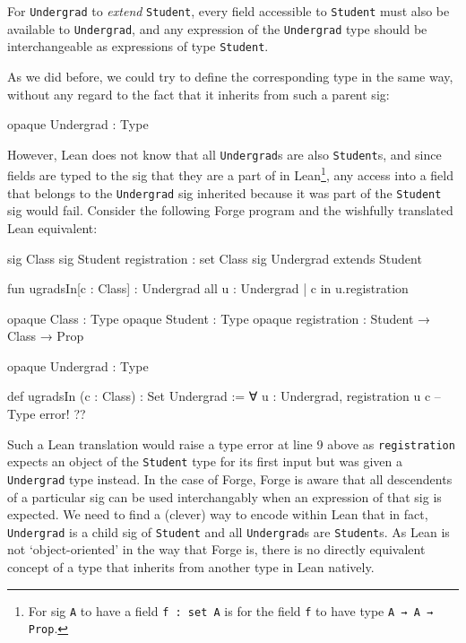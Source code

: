 For \texttt{Undergrad} to \emph{extend} \texttt{Student}, every field accessible to \texttt{Student} must also be available to \texttt{Undergrad}, and any expression of the \texttt{Undergrad} type should be interchangeable as expressions of type \texttt{Student}. 

As we did before, we could try to define the corresponding type in the same way, without any regard to the fact that it inherits from such a parent sig: 
\begin{lean*}
opaque Undergrad : Type
\end{lean*}
However, Lean does not know that all \texttt{Undergrad}s are also \texttt{Student}s, and since fields are typed to the sig that they are a part of in Lean\footnote{For sig \texttt{A} to have a field \texttt{f : set A} is for the field \texttt{f} to have type \texttt{A → A → Prop}.}, any access into a field that belongs to the \texttt{Undergrad} sig inherited because it was part of the \texttt{Student} sig would fail. Consider the following Forge program and the wishfully translated Lean equivalent:

\vspace{0.5em}
\noindent\begin{minipage}{0.5\textwidth}
\begin{forge}
sig Class {}
sig Student {
  registration : set Class
}
sig Undergrad extends Student {}

fun ugradsIn[c : Class] : Undergrad {
  all u : Undergrad |
    c in u.registration
}
\end{forge}
\end{minipage}%
\begin{minipage}{0.5\textwidth}
\begin{lean*}
opaque Class : Type
opaque Student : Type
opaque registration : Student → Class → Prop

opaque Undergrad : Type

def ugradsIn (c : Class) : Set Undergrad :=
  ∀ u : Undergrad, 
    registration u c -- Type error!
?\phantom{}?
\end{lean*}
\end{minipage}
\vspace{0.5em}

Such a Lean translation would raise a type error at line 9 above as \texttt{registration} expects an object of the \texttt{Student} type for its first input but was given a \texttt{Undergrad} type instead. In the case of Forge, Forge is aware that all descendents of a particular sig can be used interchangably when an expression of that sig is expected. We need to find a (clever) way to encode within Lean that in fact, \texttt{Undergrad} is a child sig of \texttt{Student} and all \texttt{Undergrad}s are \texttt{Student}s. As Lean is not `object-oriented' in the way that Forge is, there is no directly equivalent concept of a type that inherits from another type in Lean natively. 

